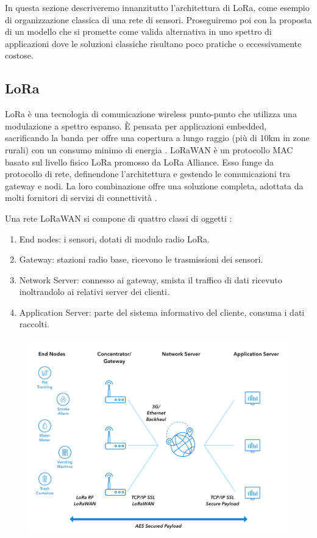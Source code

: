 \documentclass[a4paper,12pt]{article}
\theoremstyle{definition}
\begin{document}
In questa sezione descriveremo innanzitutto l'architettura di LoRa, come esempio di organizzazione classica di una rete di sensori. Proseguiremo poi con la proposta di un modello che si promette come valida alternativa in uno spettro di applicazioni dove le soluzioni classiche risultano poco pratiche o eccessivamente costose.

\subsection{LoRa}

LoRa è una tecnologia di comunicazione wireless punto-punto che utilizza una modulazione a spettro espanso. È pensata per applicazioni embedded, sacrificando la banda per offre una copertura a lungo raggio (più di 10km in zone rurali) con un consumo minimo di energia \cite{loraperf}. LoRaWAN è un protocollo MAC basato sul livello fisico LoRa promosso da LoRa Alliance. Esso funge da protocollo di rete, definendone l'architettura e gestendo le comunicazioni tra gateway e nodi. La loro combinazione offre una soluzione completa, adottata da molti fornitori di servizi di connettività \cite{netprov}.

Una rete LoRaWAN si compone di quattro classi di oggetti \cite{loraspec}:

\begin{enumerate}
\item End nodes: i sensori, dotati di modulo radio LoRa.
\item Gateway: stazioni radio base, ricevono le trasmissioni dei sensori.
\item Network Server: connesso ai gateway, smista il traffico di dati ricevuto inoltrandolo ai relativi server dei clienti.
\item Application Server: parte del sistema informativo del cliente, consuma i dati raccolti.
\end{enumerate}

\begin{figure}[H]
\centering
\includegraphics[width=4.5in]{figures/lorawan.png}
\caption{}
\end{figure}
\end{document}
